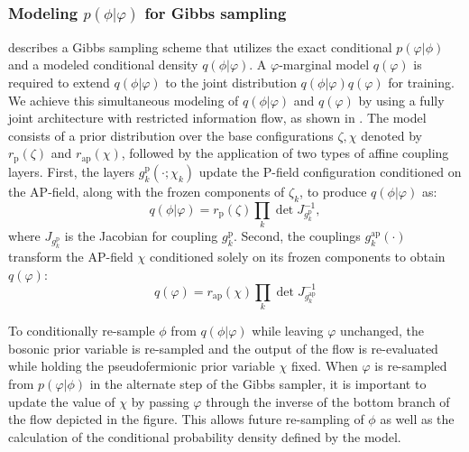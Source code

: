 \documentclass[aps,prd,twocolumn,nofootinbib,superscriptaddress,preprintnumbers]{revtex4-1}
\begin{document}
\subsubsection{Modeling \texorpdfstring{$p(\phi|\varphi)$}{p(phi|varphi)} for Gibbs sampling}
\label{sec:gibbs-modeling}

 describes a Gibbs sampling scheme that utilizes the exact conditional $p(\varphi|\phi)$ and a modeled conditional density $q(\phi|\varphi)$. A $\varphi$-marginal model $q(\varphi)$ is required to extend $q(\phi|\varphi)$ to the joint distribution $q(\phi|\varphi)q(\varphi)$ for training. We achieve this simultaneous modeling of $q(\phi|\varphi)$ and $q(\varphi)$ by using a fully joint architecture with restricted information flow, as shown in . The model consists of a prior distribution over the base configurations $\zeta, \chi$ denoted by $r_{\mathrm{p}}(\zeta)$ and $r_{\mathrm{ap}}(\chi)$, followed by the application of two types of affine coupling layers. First, the layers $g^{\mathrm{p}}_{k}(\cdot; \chi_k)$ update the P-field configuration conditioned on the AP-field, along with the frozen components of $\zeta_k$, to produce $q(\phi | \varphi)$ as: 
%
\begin{equation}
    q(\phi | \varphi) = r_{\mathrm{p}}(\zeta) \prod_{k} \det J_{g^{\mathrm{p}}_k}^{-1},
\end{equation}
%
where $J_{g^{\mathrm{p}}_k}$ is the Jacobian for coupling $g^{\mathrm{p}}_k$.
Second, the couplings $g^{\mathrm{ap}}_{k}(\cdot)$ transform the AP-field $\chi$ conditioned solely on its frozen components to obtain $q(\varphi)$:
%
\begin{equation}
    q(\varphi) = r_{\mathrm{ap}}(\chi) \prod_{k} \det J_{g^{\mathrm{ap}}_k}^{-1}
\end{equation}

To conditionally re-sample $\phi$ from $q(\phi|\varphi)$ while leaving $\varphi$ unchanged, the bosonic prior variable is re-sampled and the output of the flow is re-evaluated while holding the pseudofermionic prior variable $\chi$ fixed. When $\varphi$ is re-sampled from $p(\varphi|\phi)$ in the alternate step of the Gibbs sampler, it is important to update the value of $\chi$ by passing $\varphi$ through the inverse of the bottom branch of the flow depicted in the figure. This allows future re-sampling of $\phi$ as well as the calculation of the conditional probability density defined by the model.
\end{document}
